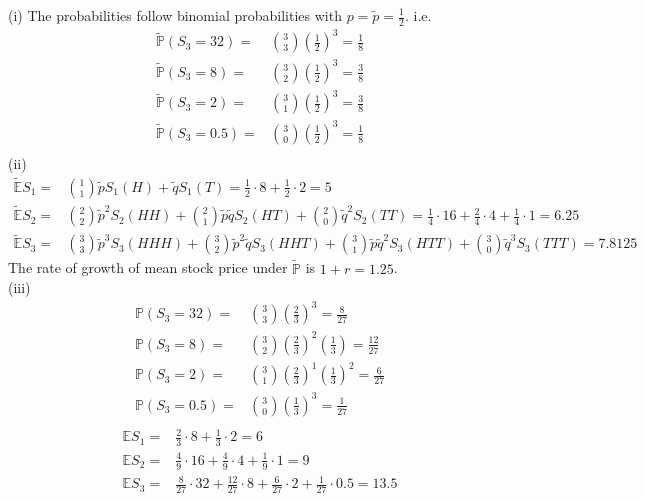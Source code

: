 \documentclass[12pt]{article}
\newenvironment{exercise}[2][Exercise]{\begin{trivlist}
		\item[\hskip \labelsep {\bfseries #1}\hskip \labelsep {\bfseries #2.}]}{\end{trivlist}}
\begin{document}
	\begin{exercise}{2}\end{exercise}
	(i) The probabilities follow binomial probabilities with $p=\tilde{p} = \frac{1}{2}$. i.e.
	\begin{align*}
	\tilde{\mathbb{P}}(S_3 = 32) =& {3\choose 3}\left(\frac{1}{2}\right)^3=\frac{1}{8}\\
	\tilde{\mathbb{P}}(S_3 = 8) =& {3\choose 2}\left(\frac{1}{2}\right)^3=\frac{3}{8}\\
	\tilde{\mathbb{P}}(S_3 = 2) =& {3\choose 1}\left(\frac{1}{2}\right)^3=\frac{3}{8}\\
	\tilde{\mathbb{P}}(S_3 = 0.5) =& {3\choose 0}\left(\frac{1}{2}\right)^3=\frac{1}{8}\\
	\end{align*}
	(ii) \begin{align*}
	\tilde{\mathbb{E}}S_1 =&{1\choose 1} \tilde{p}S_1(H)+\tilde{q}S_1(T) = \frac{1}{2}\cdot 8 +\frac{1}{2}\cdot 2 = 5\\
	\tilde{\mathbb{E}}S_2 =& {2\choose 2}\tilde{p}^2S_2(HH)+{2\choose 1}\tilde{p}\tilde{q}S_2(HT) + {2\choose 0}\tilde{q}^2 S_2(TT) = \frac{1}{4}\cdot 16 + \frac{2}{4}\cdot 4 +\frac{1}{4}\cdot 1 = 6.25\\
	\tilde{\mathbb{E}}S_3 =& {3\choose 3}\tilde{p}^3S_3(HHH)+{3\choose 2}\tilde{p}^2\tilde{q}S_3(HHT)+{3\choose 1}\tilde{p}\tilde{q}^2 S_3(HTT)+{3\choose 0}\tilde{q}^3S_3(TTT) = 7.8125
	\end{align*}
	The rate of growth of mean stock price under $\tilde{\mathbb{P}}$ is $1+r = 1.25$. \\
	(iii) \begin{align*}
	\mathbb{P}(S_3 = 32) =& {3\choose 3}\left(\frac{2}{3}\right)^3=\frac{8}{27}\\
	\mathbb{P}(S_3 = 8) =& {3\choose 2}\left(\frac{2}{3}\right)^2\left(\frac{1}{3}\right)=\frac{12}{27}\\
	\mathbb{P}(S_3 = 2) =& {3\choose 1}\left(\frac{2}{3}\right)^1\left(\frac{1}{3}\right)^2=\frac{6}{27}\\
	\mathbb{P}(S_3 = 0.5) =& {3\choose 0}\left(\frac{1}{3}\right)^3=\frac{1}{27}\\
	\end{align*}
	\begin{align*}
	\mathbb{E}S_1 =& \frac{2}{3}\cdot 8 +\frac{1}{3}\cdot 2 = 6\\
	\mathbb{E}S_2 =& \frac{4}{9}\cdot 16 + \frac{4}{9}\cdot 4 +\frac{1}{9}\cdot 1 = 9\\
	\mathbb{E}S_3 =& \frac{8}{27}\cdot 32 + \frac{12}{27}\cdot 8 + \frac{6}{27}\cdot 2 + \frac{1}{27}\cdot 0.5 = 13.5
	\end{align*}
\end{document}
